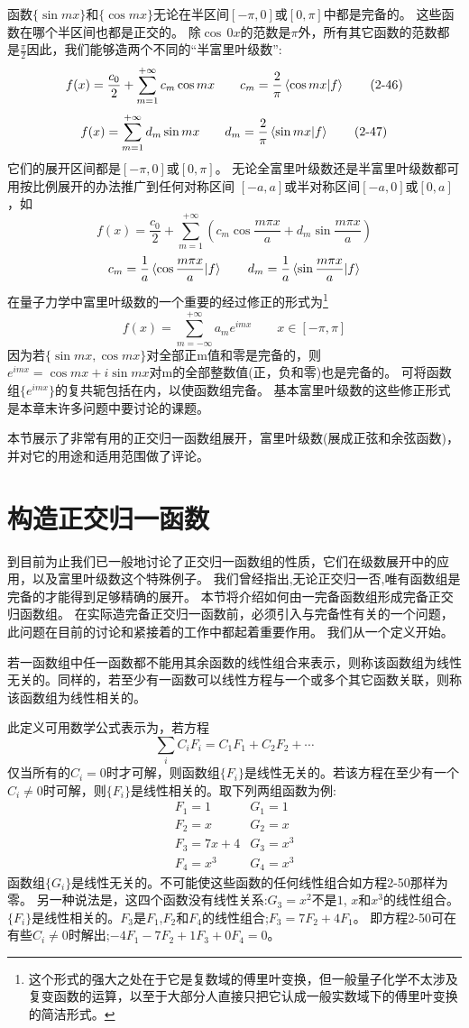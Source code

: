 函数$\{\sin mx\}$和$\{\cos mx\}$无论在半区间$[-\pi,0]$或$[0,\pi]$中都是完备的。
这些函数在哪个半区间也都是正交的。
除$\cos  \, 0x$的范数是$\pi$外，所有其它函数的范数都是$\frac{\pi}{2}$因此，我们能够造两个不同的“半富里叶级数”:
\[f(x)=\frac{c_0}{2}+\sum_{m=1}^{+\infty}c_m\cos mx \qquad c_m=\frac{2}{\pi}\bra*{\cos mx}\ket*{f} \tag{2-46}\]
\[f(x)=\sum_{m=1}^{+\infty}d_m\sin mx \qquad d_m=\frac{2}{\pi}\bra*{\sin mx}\ket*{f} \tag{2-47}\]
它们的展开区间都是$[-\pi,0]$或$[0,\pi]$。
无论全富里叶级数还是半富里叶级数都可用按比例展开的办法推广到任何对称区间
$[-a,a]$或半对称区间$[-a,0]$或$[0,a]$，如
\[f(x)=\frac{c_0}{2}+\sum_{m=1}^{+\infty} \left ( c_m\cos \frac{m\pi x}{a}+d_m\sin\frac{m\pi x}{a} \right ) \tag{2-48}\]
\[c_m=\frac{1}{a}\bra*{\cos \frac{m\pi x}{a}}\ket*{f} \qquad d_m=\frac{1}{a}\bra*{\sin\frac{m\pi x}{a}}\ket*{f}\]
在量子力学中富里叶级数的一个重要的经过修正的形式为\footnote{这个形式的强大之处在于它是复数域的傅里叶变换，但一般量子化学不太涉及复变函数的运算，以至于大部分人直接只把它认成一般实数域下的傅里叶变换的简洁形式。}
\[f(x)=\sum_{m=-\infty}^{+\infty}a_me^{imx} \qquad x \in [-\pi,\pi] \tag{2-49}\]
因为若$\{\sin mx,\cos mx\}$对全部正m值和零是完备的，则${e^{imx}=\cos mx + i\sin mx}$对m的全部整数值(正，负和零)也是完备的。
可将函数组$\{e^{imx}\}$的复共轭包括在内，以使函数组完备。
基本富里叶级数的这些修正形式是本章末许多问题中要讨论的课题。

本节展示了非常有用的正交归一函数组展开，富里叶级数(展成正弦和余弦函数)，并对它的用途和适用范围做了评论。

\section{构造正交归一函数}
到目前为止我们已一般地讨论了正交归一函数组的性质，它们在级数展开中的应用，以及富里叶级数这个特殊例子。
我们曾经指出,无论正交归一否,唯有函数组是完备的才能得到足够精确的展开。
本节将介绍如何由一完备函数组形成完备正交归函数组。
在实际造完备正交归一函数前，必须引入与完备性有关的一个问题，此问题在目前的讨论和紧接着的工作中都起着重要作用。
我们从一个定义开始。

\begin{definition}
    若一函数组中任一函数都不能用其余函数的线性组合来表示，则称该函数组为线性无关的。同样的，若至少有一函数可以线性方程与一个或多个其它函数关联，则称该函数组为线性相关的。
 \end{definition}
此定义可用数学公式表示为，若方程
\[\sum_iC_iF_i=C_1F_1+C_2F_2+ \cdots \tag{2-50}\]
仅当所有的$C_i=0$时才可解，则函数组$\{F_i\}$是线性无关的。若该方程在至少有一个$C_i \neq 0$时可解，则$\{F_i\}$是线性相关的。取下列两组函数为例:
\[
\begin{array}{ll}
    F_1=1 & G_1=1 \\
    F_2=x & G_2=x \\
    F_3=7x+4 & G_3=x^3 \\
    F_4=x^3 & G_4=x^3
\end{array}    
\]
函数组$\{G_i\}$是线性无关的。不可能使这些函数的任何线性组合如方程2-50那样为零。
另一种说法是，这四个函数没有线性关系:$G_3=x^2$不是$1$, $x$和$x^3$的线性组合。$\{F_i\}$是线性相关的。$F_3$是$F_1$,$F_2$和$F_4$的线性组合;$F_3=7F_2+4F_1$。
即方程2-50可在有些$C_i \neq 0$时解出;$-4F_1-7F_2+1F_3+0F_4=0$。

